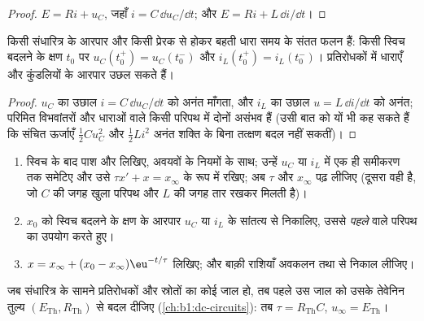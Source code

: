 \begin{proof}
 $E = Ri + u_C$, जहाँ $i = C\,\dd u_C/\dd t$; और 
$E = Ri + L\,\dd i/\dd t$।
\end{proof}

\begin{proposition}[सांतत्य की शर्तें]\label{prop:b1:transient-regimes:continuity}
किसी संधारित्र के आरपार  और किसी प्रेरक से होकर बहती धारा समय के संतत
फलन हैं: किसी स्विच बदलने के क्षण $t_0$ पर
$u_C(t_0^+) = u_C(t_0^-)$ और $i_L(t_0^+) = i_L(t_0^-)$। प्रतिरोधकों में
धाराएँ और कुंडलियों के आरपार  उछल सकते हैं।
\end{proposition}

\begin{proof}
$u_C$ का उछाल $i = C\,\dd u_C/\dd t$ को अनंत माँगता, और $i_L$ का उछाल
$u = L\,\dd i/\dd t$ को अनंत; परिमित विभवांतरों और धाराओं वाले किसी परिपथ में
दोनों असंभव हैं (उसी बात को यों भी कह सकते हैं कि संचित ऊर्जाएँ
$\tfrac12 Cu_C^2$ और $\tfrac12 Li^2$ अनंत शक्ति के बिना तत्क्षण बदल नहीं
सकतीं)।
\end{proof}

\begin{method}\label{met:b1:transient-regimes:first}
\begin{enumerate}
  \item स्विच के बाद पाश और  लिखिए, अवयवों के नियमों के साथ; उन्हें
        $u_C$ या $i_L$ में एक ही समीकरण तक समेटिए और उसे
        $\tau x' + x = x_\infty$ के रूप में रखिए; अब $\tau$ और
        $x_\infty$ पढ़ लीजिए (दूसरा वही  है, जो $C$ की जगह खुला
        परिपथ और $L$ की जगह तार रखकर मिलती है)।
  \item $x_0$ को स्विच बदलने के क्षण के आरपार $u_C$ या $i_L$ के सांतत्य से
        निकालिए, उससे \emph{पहले} वाले परिपथ का उपयोग करते हुए।
  \item $x = x_\infty + (x_0 - x_\infty)\eu^{-t/\tau}$ लिखिए; और बाक़ी
        राशियाँ अवकलन तथा  से निकाल लीजिए।
\end{enumerate}
जब संधारित्र के सामने प्रतिरोधकों और स्रोतों का कोई जाल हो, तब पहले उस जाल को
उसके तेवेनिन तुल्य $(E_{\mathrm{Th}}, R_{\mathrm{Th}})$ से बदल दीजिए
(\cref{ch:b1:dc-circuits}): तब $\tau = R_{\mathrm{Th}}C$,
$u_\infty = E_{\mathrm{Th}}$।
\end{method}

